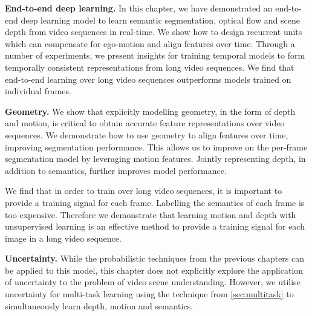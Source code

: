 \textbf{End-to-end deep learning.}
In this chapter, we have demonstrated an end-to-end deep learning model to learn semantic segmentation, optical flow and scene depth from video sequences in real-time. We show how to design recurrent units which can compensate for ego-motion and align features over time. Through a number of experiments, we present insights for training temporal models to form temporally consistent representations from long video sequences. We find that end-to-end learning over long video sequences outperforms models trained on individual frames.

\textbf{Geometry.}
We show that explicitly modelling geometry, in the form of depth and motion, is critical to obtain accurate feature representations over video sequences. We demonstrate how to use geometry to align features over time, improving segmentation performance. This allows us to improve on the per-frame segmentation model by leveraging motion features. Jointly representing depth, in addition to semantics, further improves model performance.

We find that in order to train over long video sequences, it is important to provide a training signal for each frame. Labelling the semantics of each frame is too expensive. Therefore we demonstrate that learning motion and depth with unsupervised learning is an effective method to provide a training signal for each image in a long video sequence.

\textbf{Uncertainty.}
While the probabilistic techniques from the previous chapters can be applied to this model, this chapter does not explicitly explore the application of uncertainty to the problem of video scene understanding. However, we utilise uncertainty for multi-task learning using the technique from \cref{sec:multitask} to simultaneously learn depth, motion and semantics.

